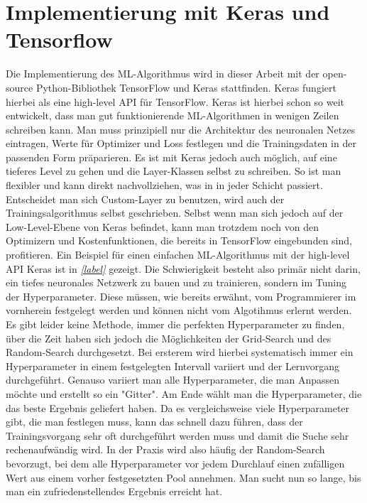 \section{Implementierung mit Keras und Tensorflow}
Die Implementierung des ML-Algorithmus wird in dieser Arbeit mit der open-source Python-Bibliothek TensorFlow und Keras stattfinden. Keras fungiert hierbei als eine high-level API für TensorFlow. Keras ist hierbei schon so weit entwickelt, dass man gut funktionierende ML-Algorithmen in wenigen Zeilen schreiben kann. Man muss prinzipiell nur die Architektur des neuronalen Netzes eintragen, Werte für Optimizer und Loss festlegen und die Trainingsdaten in der passenden Form präparieren. Es ist mit Keras jedoch auch möglich, auf eine tieferes Level zu gehen und die Layer-Klassen selbst zu schreiben. So ist man flexibler und kann direkt nachvollziehen, was in in jeder Schicht passiert. Entscheidet man sich Custom-Layer zu benutzen, wird auch der Trainingsalgorithmus selbst geschrieben. Selbst wenn man sich jedoch auf der Low-Level-Ebene von Keras befindet, kann man trotzdem noch von den Optimizern und Kostenfunktionen, die bereits in TensorFlow eingebunden sind, profitieren. Ein Beispiel für einen einfachen ML-Algorithmus mit der high-level API Keras ist in \textit{\autoref{label}} gezeigt.
Die Schwierigkeit besteht also primär nicht darin, ein tiefes neuronales Netzwerk zu bauen und zu trainieren, sondern im Tuning der Hyperparameter. Diese müssen, wie bereits erwähnt, vom Programmierer im vornherein festgelegt werden und können nicht vom Algotihmus erlernt werden. Es gibt leider keine Methode, immer die perfekten Hyperparameter zu finden, über die Zeit haben sich jedoch die Möglichkeiten der Grid-Search und des Random-Search durchgesetzt. Bei ersterem wird hierbei systematisch immer ein Hyperparameter in einem festgelegten Intervall variiert und der Lernvorgang durchgeführt. Genauso variiert man alle Hyperparameter, die man Anpassen möchte und erstellt so ein "Gitter". Am Ende wählt man die Hyperparameter, die das beste Ergebnis geliefert haben. Da es vergleichsweise viele Hyperparameter gibt, die man festlegen muss, kann das schnell dazu führen, dass der Trainingsvorgang sehr oft durchgeführt werden muss und damit die Suche sehr rechenaufwändig wird. In der Praxis wird also häufig der Random-Search bevorzugt, bei dem alle Hyperparameter vor jedem Durchlauf einen zufälligen Wert aus einem vorher festgesetzten Pool annehmen. Man sucht nun so lange, bis man ein zufriedenstellendes Ergebnis erreicht hat.       


